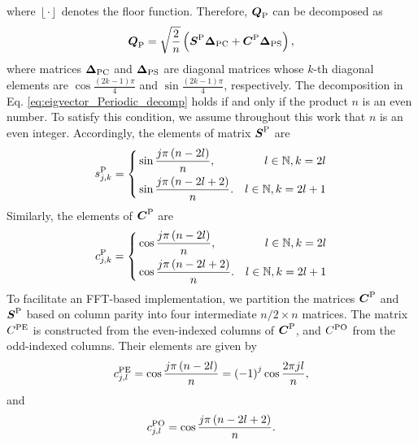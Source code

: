 \documentclass[preprint]{elsarticle}
\begin{document}
where $\left\lfloor\cdot\right\rfloor$ denotes the floor function. Therefore, $\boldsymbol{Q}_{\rm P}$ can be decomposed as
\begin{equation}
    \label{eq:eigvector_Periodic_decomp}
    \boldsymbol{Q}_{\rm P}=\sqrt{\frac{2}{n}}\left(\boldsymbol{S}^{\rm P}\boldsymbol{\Delta}_{\rm PC}+\boldsymbol{C}^{\rm P}\boldsymbol{\Delta}_{\rm PS}\right),
\end{equation}
where matrices $\boldsymbol{\Delta}_{\rm PC}$ and $\boldsymbol{\Delta}_{\rm PS}$ are diagonal matrices whose $k$-th diagonal elements are $\cos\frac{\left(2k-1\right)\pi}{4}$ and $\sin\frac{\left(2k-1\right)\pi}{4}$, respectively. The decomposition in Eq. \eqref{eq:eigvector_Periodic_decomp} holds if and only if the product $n$ is an even number. To satisfy this condition, we assume throughout this work that $n$ is an even integer. Accordingly, the elements of matrix $\boldsymbol{S}^{\rm P}$ are
\begin{equation}
    \label{eq:Periodic_mat_s_p_element}
    s^{\rm P}_{j,k}=\left\{\begin{aligned}
        &\sin\frac{j\pi\left(n-2l\right)}{n}, &l\in\mathbb{N},k=2l\\
        &\sin\frac{j\pi\left(n-2l+2\right)}{n}. &l\in\mathbb{N},k=2l+1
    \end{aligned}\right.
\end{equation}
Similarly, the elements of $\boldsymbol{C}^{\rm P}$ are
\begin{equation}
    \label{eq:Periodic_mat_c_p_element}
    c^{\rm P}_{j,k}=\left\{\begin{aligned}
        &\cos\frac{j\pi\left(n-2l\right)}{n}, &l\in\mathbb{N},k=2l\\
        &\cos\frac{j\pi\left(n-2l+2\right)}{n}. &l\in\mathbb{N},k=2l+1
    \end{aligned}\right.
\end{equation}
To facilitate an FFT-based implementation, we partition the matrices $\boldsymbol{C}^{\rm P}$ and $\boldsymbol{S}^{\rm P}$ based on column parity into four intermediate $n/2 \times n$ matrices. The matrix $C^{\rm PE}$ is constructed from the even-indexed columns of $\boldsymbol{C}^{\rm P}$, and $C^{\rm PO}$ from the odd-indexed columns. Their elements are given by
\begin{equation}
    \label{eq:Periodic_mat_c_pe_element}
    c^{\rm PE}_{j,l}=\cos\frac{j\pi\left(n-2l\right)}{n}=\left(-1\right)^j\cos\frac{2\pi jl}{n},
\end{equation}
and
\begin{equation}
    \label{eq:Periodic_mat_c_po_element}
    c^{\rm PO}_{j,l}=\cos\frac{j\pi\left(n-2l+2\right)}{n}.
\end{equation}
\end{document}
